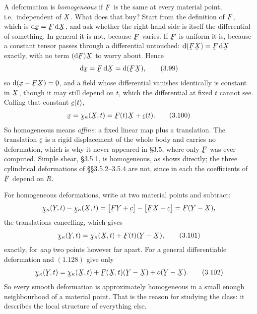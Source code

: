 A deformation is \emph{homogeneous} if $\bF$ is the same at every material
point, i.e.\ independent of $\bX$. What does that buy? Start from the
definition of $\bF$, which is $\dl\bx=\bF\,\dl\bX$, and ask whether the
right-hand side is itself the differential of something. In general it is
not, because $\bF$ varies. If $\bF$ is uniform it is, because a constant
tensor passes through a differential untouched:
$\dl(\bF\bX)=\bF\,\dl\bX$ exactly, with no term $(\dl\bF)\bX$ to worry
about. Hence
\begin{equation}
   \dl\bx=\bF\,\dl\bX=\dl(\bF\bX),
   \tag{3.99}\label{eq:3.99}
\end{equation}
so $\dl(\bx-\bF\bX)=\bze$, and a field whose differential vanishes
identically is constant in $\bX$, though it may still depend on $t$, which
the differential at fixed $t$ cannot see. Calling that constant $\bc(t)$,
\begin{equation}
   \bx=\bchi_{\kappa}(\bX,t)=\bF(t)\bX+\bc(t).
   \tag{3.100}\label{eq:3.100}
\end{equation}
So homogeneous means \emph{affine}: a fixed linear map plus a translation.
The translation $\bc$ is a rigid displacement of the whole body and
carries no deformation, which is why it never appeared in \S3.5, where
only $\bF$ was ever computed. Simple shear, \S3.5.1, is homogeneous, as
 shows directly; the three cylindrical deformations of
\S\S3.5.2--3.5.4 are not, since in each the coefficients of $\bF$ depend on
$R$.

For homogeneous deformations, write  at two material points and
subtract:
\[
   \bchi_{\kappa}(\bY,t)-\bchi_{\kappa}(\bX,t)
   =\big[\bF\bY+\bc\big]-\big[\bF\bX+\bc\big]
   =\bF(\bY-\bX),
\]
the translations cancelling, which gives
\begin{equation}
   \bchi_{\kappa}(\bY,t)=\bchi_{\kappa}(\bX,t)+\bF(t)(\bY-\bX),
   \tag{3.101}\label{eq:3.101}
\end{equation}
exactly, for \emph{any} two points however far apart. For a general
differentiable deformation  and $(1.128)$ give only
\begin{equation}
   \bchi_{\kappa}(\bY,t)=\bchi_{\kappa}(\bX,t)+\bF(\bX,t)(\bY-\bX)
     +o(\bY-\bX).
   \tag{3.102}\label{eq:3.102}
\end{equation}
So every smooth deformation is approximately homogeneous in a small enough
neighbourhood of a material point. That is the reason for studying the
class: it describes the local structure of everything else.

